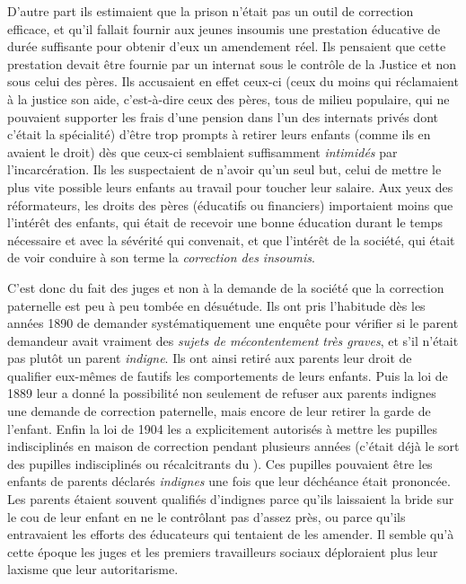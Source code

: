 { D'autre part ils estimaient que la prison n'était pas un outil de correction efficace, et qu'il fallait fournir aux jeunes insoumis une prestation éducative de durée suffisante pour obtenir d'eux un amendement réel. Ils pensaient que cette prestation devait être fournie par un internat sous le contrôle de la Justice et non sous celui des pères. Ils accusaient en effet ceux-ci (ceux du moins qui réclamaient à la justice son aide, c'est-à-dire ceux des pères, tous de milieu populaire, qui ne pouvaient supporter les frais d'une pension dans l'un des internats privés dont c'était la spécialité) d'être trop prompts à retirer leurs enfants (comme ils en avaient le droit) dès que ceux-ci semblaient suffisamment \emph{intimidés} par l'incarcération. Ils les suspectaient de n'avoir qu'un seul but, celui de mettre le plus vite possible leurs enfants au travail pour toucher leur salaire. Aux yeux des réformateurs, les droits des pères (éducatifs ou financiers) importaient moins que l'intérêt des enfants, qui était de recevoir une bonne éducation durant le temps nécessaire et avec la sévérité qui convenait, et que l'intérêt de la société, qui était de voir conduire à son terme la \emph{correction des insoumis}. 

 C'est donc du fait des juges et non à la demande de la société que la correction paternelle est peu à peu tombée en désuétude. Ils ont pris l'habitude dès les années 1890 de demander systématiquement une enquête pour vérifier si le parent demandeur avait vraiment des \emph{sujets de mécontentement très graves}, et s'il n'était pas plutôt un parent \emph{indigne}. Ils ont ainsi retiré aux parents leur droit de qualifier eux-mêmes de fautifs les comportements de leurs enfants. Puis la loi de 1889 leur a donné la possibilité non seulement de refuser aux parents indignes une demande de correction paternelle, mais encore de leur retirer la garde de l'enfant. Enfin la loi de 1904 les a explicitement autorisés à mettre les pupilles indisciplinés en maison de correction pendant plusieurs années (c'était déjà le sort des pupilles indisciplinés ou récalcitrants du ). Ces pupilles pouvaient être les enfants de parents déclarés \emph{indignes} une fois que leur déchéance était prononcée. Les parents étaient souvent qualifiés d'indignes parce qu'ils laissaient la bride sur le cou de leur enfant en ne le contrôlant pas d'assez près, ou parce qu'ils entravaient les efforts des éducateurs qui tentaient de les amender. Il semble qu'à cette époque les juges et les premiers travailleurs sociaux déploraient plus leur laxisme que leur autoritarisme. 

}

